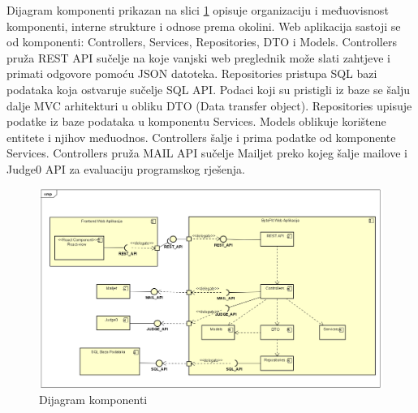 Dijagram komponenti prikazan na slici \ref{fig:dijagramKomponenti} opisuje organizaciju i međuovisnost  komponenti, interne strukture i odnose prema okolini. Web aplikacija sastoji se od komponenti: Controllers, Services, Repositories, DTO i Models. Controllers pruža REST API sučelje na koje vanjski web preglednik može slati zahtjeve i primati odgovore pomoću JSON datoteka. Repositories pristupa SQL bazi podataka koja ostvaruje sučelje SQL API. Podaci koji su pristigli iz baze se šalju dalje MVC arhitekturi u obliku DTO (Data transfer object). Repositories upisuje podatke iz baze podataka u komponentu Services. Models oblikuje korištene entitete i njihov međuodnos. Controllers šalje i prima podatke od komponente Services. Controllers pruža MAIL API sučelje Mailjet preko kojeg šalje mailove i Judge0 API za evaluaciju programskog rješenja.
\\
\begin{figure}[H]
	\includegraphics[scale=0.5]{dijagrami/dijagramKomponenti.png}
	\centering
	\caption{Dijagram komponenti}
	\label{fig:dijagramKomponenti}
\end{figure}
%
%

